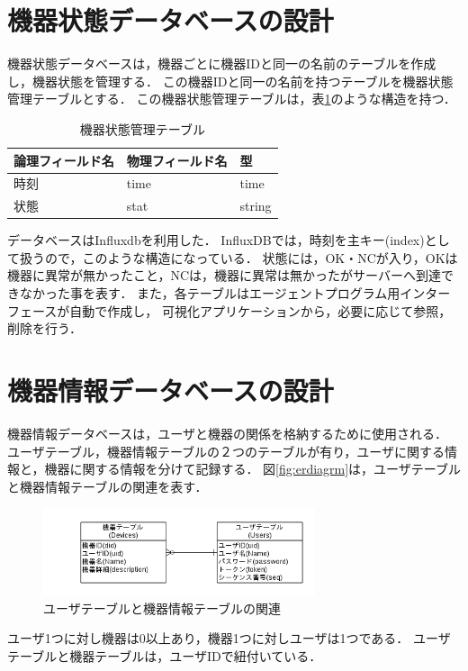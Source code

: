 \section{機器状態データベースの設計}
機器状態データベースは，機器ごとに機器IDと同一の名前のテーブルを作成し，機器状態を管理する．
この機器IDと同一の名前を持つテーブルを機器状態管理テーブルとする．
この機器状態管理テーブルは，表\ref{tab:devstat}のような構造を持つ．
\begin{table}[htb]
\begin{center}
\caption{機器状態管理テーブル}
\label{tab:devstat}
\begin{tabular}{|l|l|l|} \hline
論理フィールド名 & 物理フィールド名 & 型 \\ \hline \hline
時刻 & time & time \\ \hline
状態 & stat & string \\ \hline
\end{tabular}
\end{center}
\end{table}

データベースはInfluxdbを利用した．
InfluxDBでは，時刻を主キー(index)として扱うので，このような構造になっている．
状態には，OK・NCが入り，OKは機器に異常が無かったこと，NCは，機器に異常は無かったがサーバーへ到達できなかった事を表す．
また，各テーブルはエージェントプログラム用インターフェースが自動で作成し，
可視化アプリケーションから，必要に応じて参照，削除を行う．

\section{機器情報データベースの設計}
機器情報データベースは，ユーザと機器の関係を格納するために使用される．
ユーザテーブル，機器情報テーブルの２つのテーブルが有り，ユーザに関する情報と，機器に関する情報を分けて記録する．
図\ref{fig:erdiagrm}は，ユーザテーブルと機器情報テーブルの関連を表す．
\begin{figure}[htbp]
\includegraphics[width=8cm]{images/ERdiagram.png}
\caption{ユーザテーブルと機器情報テーブルの関連}
\label{fig:erdiagram}
\end{figure}
ユーザ1つに対し機器は0以上あり，機器1つに対しユーザは1つである．
ユーザテーブルと機器テーブルは，ユーザIDで紐付いている．

